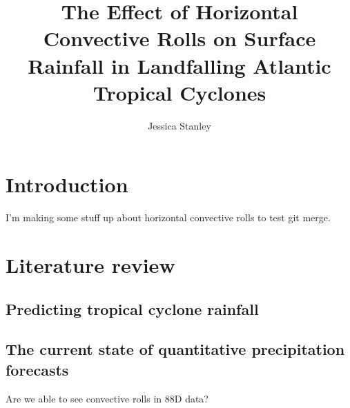 \documentclass[12pt]{article}
\author{Jessica Stanley} \title{The Effect of Horizontal Convective Rolls on Surface Rainfall in Landfalling Atlantic Tropical Cyclones}
\begin{document}
\maketitle


\section{Introduction}

I'm making some stuff up about horizontal convective rolls to test git merge.

\section{Literature review}

\subsection{Predicting tropical cyclone rainfall} 

\subsection{The current state of quantitative precipitation forecasts}

Are we able to see convective rolls in 88D data?
\end{document}
